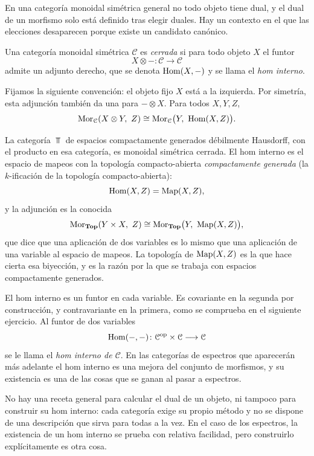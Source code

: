 En una categoría monoidal simétrica general no todo objeto tiene dual, y el dual de un morfismo solo está definido tras elegir duales. Hay un contexto en el que las elecciones desaparecen porque existe un candidato canónico.

\begin{defi}\label{defi:cerrada}
Una categoría monoidal simétrica $\mathcal C$ es \emph{cerrada} si para todo objeto $X$ el funtor
\[
X\otimes-\colon\mathcal C\longrightarrow\mathcal C
\]
admite un adjunto derecho, que se denota $\operatorname{Hom}(X,-)$ y se llama el \emph{hom interno}.
\end{defi}

Fijamos la siguiente convención: el objeto fijo $X$ está a la izquierda. Por simetría, esta adjunción también da una para $-\otimes X$. Para todos $X,Y,Z$,
\[
\hom_{\mathcal C}(X\otimes Y,\ Z)\cong\hom_{\mathcal C}\bigl(Y,\ \ihom(X,Z)\bigr).
\]

\begin{ejem}\label{ejem:top-cerrada}
La categoría $\Top$ de espacios compactamente generados débilmente Hausdorff, con el producto en esa categoría, es monoidal simétrica cerrada. El hom interno es el espacio de mapeos con la topología compacto-abierta \emph{compactamente generada} (la $k$-ificación de la topología compacto-abierta):
\[
\operatorname{Hom}(X,Z)=\operatorname{Map}(X,Z),
\]
y la adjunción es la conocida
\[
\hom_{\Top}(Y\times X,\ Z)\cong\hom_{\Top}\bigl(Y,\ \Map(X,Z)\bigr),
\]
que dice que una aplicación de dos variables es lo mismo que una aplicación de una variable al espacio de mapeos. La topología de $\operatorname{Map}(X,Z)$ es la que hace cierta esa biyección, y es la razón por la que se trabaja con espacios compactamente generados.
\end{ejem}

\begin{nota}
   El hom interno es un funtor en cada variable. Es covariante en la segunda por construcción, y contravariante en la primera, como se comprueba en el siguiente ejercicio. Al funtor de dos variables
   \[
   \operatorname{Hom}(-,-)\colon\mathcal C^{\mathrm{op}}\times\mathcal C\longrightarrow\mathcal C
   \]
   se le llama el \emph{hom interno de $\mathcal C$}. En las categorías de espectros que aparecerán más adelante el hom interno es una mejora del conjunto de morfismos, y su existencia es una de las cosas que se ganan al pasar a espectros.

   No hay una receta general para calcular el dual de un objeto, ni tampoco para construir su hom interno: cada categoría exige su propio método y no se dispone de una descripción que sirva para todas a la vez. En el caso de los espectros, la existencia de un hom interno se prueba con relativa facilidad, pero construirlo explícitamente es otra cosa.
\end{nota}

